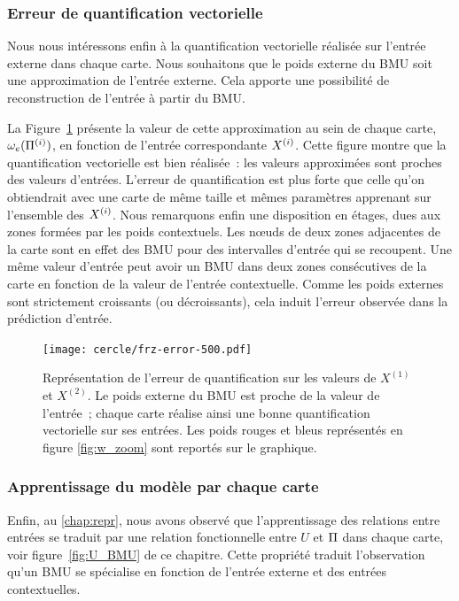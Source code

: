 \documentclass[../main]{subfiles}
\begin{document}
\subsubsection{Erreur de quantification vectorielle}

Nous nous intéressons enfin à la quantification vectorielle réalisée sur l'entrée externe dans chaque carte. 
Nous souhaitons que le poids externe du BMU soit une approximation de l'entrée externe. Cela apporte une possibilité de reconstruction de l'entrée à partir du BMU.

La Figure~\ref{fig:qv} présente la valeur de cette approximation au sein de chaque carte, $\omega_{e}(\Pi^{({i})})$, en fonction de l'entrée correspondante $X^{({i})}$. 
Cette figure montre que la quantification vectorielle est bien réalisée~: les valeurs approximées sont proches des valeurs d'entrées.
L'erreur de quantification est plus forte que celle qu'on obtiendrait avec une carte de même taille et mêmes paramètres apprenant sur l'ensemble des $X^{({i})}$.
Nous remarquons enfin une disposition en étages, dues aux zones formées par les poids contextuels.
Les n\oe{}uds de deux zones adjacentes de la carte sont en effet des BMU pour des intervalles d'entrée qui se recoupent.
Une même valeur d'entrée peut avoir un BMU dans deux zones consécutives de la carte en fonction de la valeur de l'entrée contextuelle. 
Comme les poids externes sont strictement croissants (ou décroissants), cela induit l'erreur observée dans la prédiction d'entrée.

\begin{figure}[h!]
	\centering\texttt{[image: cercle/frz-error-500.pdf]}
	\caption{Représentation de l'erreur de quantification sur les valeurs de $X^{(1)}$ et $X^{(2)}$. Le poids externe du BMU est proche de la valeur de l'entrée~; chaque carte réalise ainsi une bonne quantification vectorielle sur ses entrées. 
	Les poids rouges et bleus représentés en figure \ref{fig:w_zoom} sont reportés sur le graphique. \label{fig:qv}}
\end{figure}

\subsubsection{Apprentissage du modèle par chaque carte}

Enfin, au \ref{chap:repr}, nous avons observé que l'apprentissage des relations entre entrées se traduit par une relation fonctionnelle entre $U$ et $\Pi$ dans chaque carte, voir figure~\ref{fig:U_BMU} de ce chapitre.
Cette propriété traduit l'observation qu'un BMU se spécialise en fonction de l'entrée externe et des entrées contextuelles.
\end{document}
